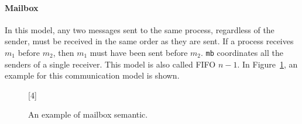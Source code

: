 
\paragraph{Mailbox}
In this model, any two messages sent to the same process, regardless of the sender, 
must be received in the same order as they are sent. If a process receives $m_1$ 
before $m_2$, then $m_1$ must have been sent before $m_2$. \verb|mb| coordinates all 
the senders of a single receiver. This model is also called FIFO $n-1$.
In Figure~\ref{fig:mailbox}, an example for this communication model is shown.

\begin{figure}[!ht]
	\centering
	\begin{msc}[draw frame=none, draw head=none, msc keyword=, 
				head height=0px, label distance=0.5ex, 
				foot height=0px, foot distance=0px]{}

		[4]
		\nextlevel
		\nextlevel
		\nextlevel
	\end{msc}
	\caption{An example of mailbox semantic.}
	\label{fig:mailbox}
\end{figure}




